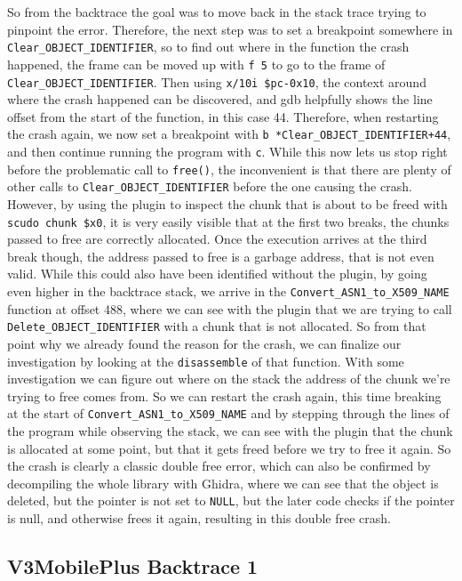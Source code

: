 \documentclass[a4paper,11pt,oneside]{report}
\begin{document}
So from the backtrace the goal was to move back in the stack trace trying to
pinpoint the error. Therefore, the next step was to set a breakpoint somewhere
in \verb|Clear_OBJECT_IDENTIFIER|, so to find out where in the function the
crash happened, the frame can be moved up with \verb|f 5| to go to the frame
of \verb|Clear_OBJECT_IDENTIFIER|. Then using \verb|x/10i $pc-0x10|, the
context around where the crash happened can be discovered, and gdb helpfully
shows the line offset from the start of the function, in this case 44.
Therefore, when restarting the crash again, we now set a breakpoint with
\verb|b *Clear_OBJECT_IDENTIFIER+44|, and then continue running the program
with \verb|c|. While this now lets us stop right before the problematic call
to \verb|free()|, the inconvenient is that there are plenty of other calls to
\verb|Clear_OBJECT_IDENTIFIER| before the one causing the crash. However, by
using the plugin to inspect the chunk that is about to be freed with
\verb|scudo chunk $x0|, it is very easily visible that at the first two breaks,
the chunks passed to free are correctly allocated. Once the execution arrives
at the third break though, the address passed to free is a garbage address,
that is not even valid.
While this could also have been identified without the plugin, by going even
higher in the backtrace stack, we arrive in the \verb|Convert_ASN1_to_X509_NAME|
function at offset 488, where we can see with the plugin that we are trying
to call \verb|Delete_OBJECT_IDENTIFIER| with a chunk that is not allocated.
So from that point why we already found the reason for the crash, we can
finalize our investigation by looking at the \verb|disassemble| of that
function. With some investigation we can figure out where on the stack the
address of the chunk we're trying to free comes from. So we can restart the
crash again, this time breaking at the start of \verb|Convert_ASN1_to_X509_NAME|
and by stepping through the lines of the program while observing the stack,
we can see with the plugin that the chunk is allocated at some point, but
that it gets freed before we try to free it again. So the crash is clearly
a classic double free error, which can also be confirmed by decompiling the
whole library with Ghidra, where we can see that the object is deleted, but
the pointer is not set to \verb|NULL|, but the later code checks if the
pointer is null, and otherwise frees it again, resulting in this double free
crash.

\subsection{V3MobilePlus Backtrace 1}
\end{document}
